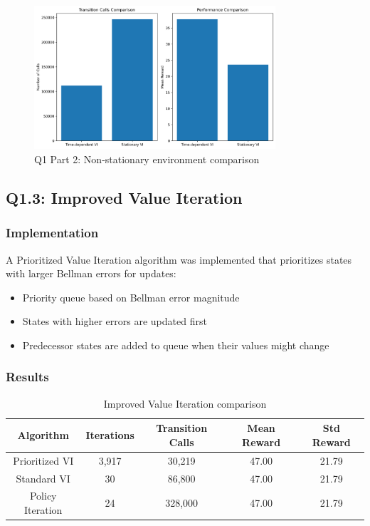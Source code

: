 \documentclass[12pt]{article}
\begin{document}
\begin{figure}[H]
\centering
\includegraphics[width=0.8\textwidth]{../Q1/part2/q1_part2_results.png}
\caption{Q1 Part 2: Non-stationary environment comparison}
\end{figure}

\subsection{Q1.3: Improved Value Iteration}

\subsubsection{Implementation}

A Prioritized Value Iteration algorithm was implemented that prioritizes states with larger Bellman errors for updates:
\begin{itemize}
    \item Priority queue based on Bellman error magnitude
    \item States with higher errors are updated first
    \item Predecessor states are added to queue when their values might change
\end{itemize}

\subsubsection{Results}

\begin{table}[H]
\centering
\begin{tabular}{|c|c|c|c|c|}
\hline
Algorithm & Iterations & Transition Calls & Mean Reward & Std Reward \\
\hline
Prioritized VI & 3,917 & 30,219 & 47.00 & 21.79 \\
Standard VI & 30 & 86,800 & 47.00 & 21.79 \\
Policy Iteration & 24 & 328,000 & 47.00 & 21.79 \\
\hline
\end{tabular}
\caption{Improved Value Iteration comparison}
\end{table}
\end{document}
